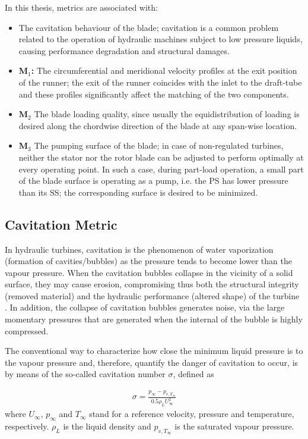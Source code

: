 In this thesis, metrics are associated with:
\begin{itemize}
\item{\textbf{}} The cavitation behaviour of the blade; cavitation is a common problem related to the operation of hydraulic machines subject to low pressure liquids, causing performance degradation and structural damages.
\item{\textbf{M$_1$:}} The circumferential and meridional velocity profiles at the exit position of the runner; the exit of the runner coincides with the inlet to the draft-tube and these profiles significantly affect the matching of the two components.
\item{\textbf{M$_2$}} The blade loading quality, since usually the equidistribution of loading is desired along the chordwise direction of the blade at any span-wise location.
\item{\textbf{M$_3$}} The pumping surface of the blade; in case of non-regulated turbines, neither the stator nor the rotor blade can be adjusted to perform optimally at every operating point. In such a case, during  part-load operation, a small part of the blade surface is operating as a pump, i.e. the PS has lower pressure than its SS; the corresponding surface is desired to be minimized.
\end{itemize}


\subsection{Cavitation Metric}
\label{cav.metric}
In hydraulic turbines, cavitation is the phenomenon of water vaporization (formation of cavities/bubbles) as the pressure tends to become lower than the vapour pressure. When the cavitation bubbles collapse in the vicinity of a solid surface, they may cause erosion, compromising thus both the structural integrity (removed material) and the hydraulic performance (altered shape) of the turbine \cite{thiruvengadam1974handbook,knapp1970cavitation,brennen1995cavitation}.  In addition, the collapse of cavitation bubbles generates noise, via the large momentary pressures that are generated when the internal of the bubble is highly compressed.

The conventional way to characterize how close the minimum liquid pressure is to the vapour pressure and, therefore, quantify the danger of cavitation to occur, is by means of the so-called cavitation number $\sigma$, defined as

\begin{eqnarray}
		\sigma=\frac{p_{\infty}-p_{v,T_{\infty}}}{0.5\rho_{L}U^2_{\infty}}
\label{Cavi}
\end{eqnarray}
where $U_{\infty}$, $p_{\infty}$ and $T_{\infty}$ stand for a reference velocity, pressure and temperature, respectively. $\rho_{L}$ is the liquid density and $p_{v,T_{\infty}}$  is the saturated vapour pressure. 

